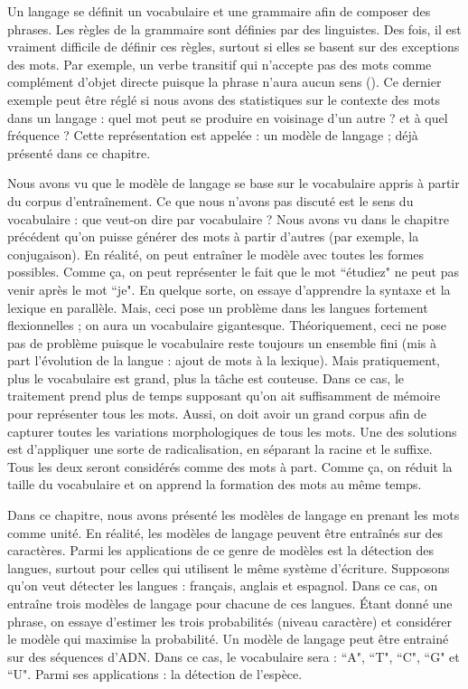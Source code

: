 \documentclass{KodeBook}
\begin{document}
\begin{discussion}

Un langage se définit un vocabulaire et une grammaire afin de composer des phrases. 
Les règles de la grammaire sont définies par des linguistes. 
Des fois, il est vraiment difficile de définir ces règles, surtout si elles se basent sur des exceptions des mots. 
Par exemple, un verbe transitif qui n'accepte pas des mots comme complément d'objet directe puisque la phrase n'aura aucun sens (). 
Ce dernier exemple peut être réglé si nous avons des statistiques sur le contexte des mots dans un langage : quel mot peut se produire en voisinage d'un autre ? et à quel fréquence ?
Cette représentation est appelée : un modèle de langage ; déjà présenté dans ce chapitre. 

Nous avons vu que le modèle de langage se base sur le vocabulaire appris à partir du corpus d'entraînement. 
Ce que nous n'avons pas discuté est le sens du vocabulaire : que veut-on dire par vocabulaire ?
Nous avons vu dans le chapitre précédent qu'on puisse générer des mots à partir d'autres (par exemple, la conjugaison).
En réalité, on peut entraîner le modèle avec toutes les formes possibles. 
Comme ça, on peut représenter le fait que le mot ``étudiez" ne peut pas venir après le mot ``je".
En quelque sorte, on essaye d'apprendre la syntaxe et la lexique en parallèle. 
Mais, ceci pose un problème dans les langues fortement flexionnelles ; on aura un vocabulaire gigantesque.
Théoriquement, ceci ne pose pas de problème puisque le vocabulaire reste toujours un ensemble fini (mis à part l'évolution de la langue : ajout de mots à la lexique). 
Mais pratiquement, plus le vocabulaire est grand, plus la tâche est couteuse. 
Dans ce cas, le traitement prend plus de temps supposant qu'on ait suffisamment de mémoire pour représenter tous les mots. 
Aussi, on doit avoir un grand corpus afin de capturer toutes les variations morphologiques de tous les mots. 
Une des solutions est d'appliquer une sorte de radicalisation, en séparant la racine et le suffixe. 
Tous les deux seront considérés comme des mots à part. 
Comme ça, on réduit la taille  du vocabulaire et on apprend la formation des mots au même temps. 

Dans ce chapitre, nous avons présenté les modèles de langage en prenant les mots comme unité. 
En réalité, les modèles de langage peuvent être entraînés sur des caractères. 
Parmi les applications de ce genre de modèles est la détection des langues, surtout pour celles qui utilisent le même système d'écriture. 
Supposons qu'on veut détecter les langues : français, anglais et espagnol. 
Dans ce cas, on entraîne trois modèles de langage pour chacune de ces langues. 
Étant donné une phrase, on essaye d'estimer les trois probabilités (niveau caractère) et considérer le modèle qui maximise la probabilité. 
Un modèle de langage peut être entrainé sur des séquences d'ADN. 
Dans ce cas, le vocabulaire sera : ``A", ``T", ``C", ``G" et ``U". 
Parmi ses applications : la détection de l'espèce. 
\end{discussion}

\ifx\wholebook\relax\else
% 
% 
	
\end{document}
